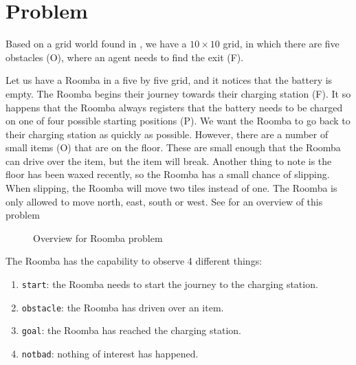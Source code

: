\section{Problem}

Based on a grid world found in \cite{g:gridworld}, we have a $10\times 10$ grid, in which there are five obstacles (O), where an agent needs to find the exit (F). 


Let us have a Roomba in a five by five grid, and it notices that the battery is empty. The Roomba begins their journey towards their charging station (F). It so happens that the Roomba always registers that the battery needs to be charged on one of four possible starting positions (P). We want the Roomba to go back to their charging station as quickly as possible. However, there are a number of small items (O) that are on the floor. These are small enough that the Roomba can drive over the item, but the item will break. Another thing to note is the floor has been waxed recently, so the Roomba has a small chance of slipping. When slipping, the Roomba will move two tiles instead of one. The Roomba is only allowed to move north, east, south or west. See  for an overview of this problem

\begin{figure}[H]
\centering
{}
\caption{Overview for Roomba problem}
\label{f:10by10grid}
\end{figure}

The Roomba has the capability to observe 4 different things:
\begin{enumerate}
\item \texttt{start}: the Roomba needs to start the journey to the charging station.
\item \texttt{obstacle}: the Roomba has driven over an item.
\item \texttt{goal}: the Roomba has reached the charging station.
\item \texttt{notbad}: nothing of interest has happened. 
\end{enumerate} 

